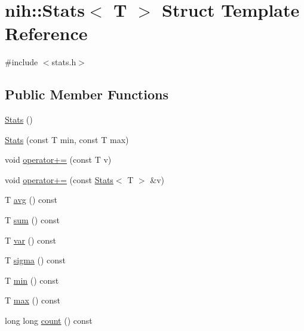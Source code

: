\hypertarget{structnih_1_1_stats}{
\section{nih\-:\-:\-Stats$<$ \-T $>$ \-Struct \-Template \-Reference}
\label{structnih_1_1_stats}
}


{\ttfamily \#include $<$stats.\-h$>$}

\subsection*{\-Public \-Member \-Functions}
\begin{DoxyCompactItemize}
\item 
\hyperlink{structnih_1_1_stats_a6e6d6f04266848eda17225b1f0402953}{\-Stats} ()
\item 
\hyperlink{structnih_1_1_stats_a882a0ca9d48e403ff6026936b669b1bb}{\-Stats} (const \-T min, const \-T max)
\item 
void \hyperlink{structnih_1_1_stats_a3cab0803fe20106b282de8d2e3dfcb3d}{operator+=} (const \-T v)
\item 
void \hyperlink{structnih_1_1_stats_aaddb68f2119f81f83c94ea2afe3e2aa0}{operator+=} (const \hyperlink{structnih_1_1_stats}{\-Stats}$<$ \-T $>$ \&v)
\item 
\-T \hyperlink{structnih_1_1_stats_af01f7f8dd7a128d55d408481e72d6615}{avg} () const 
\item 
\-T \hyperlink{structnih_1_1_stats_af08c497de2da6e0fb9f1e0e58cc7d7d5}{sum} () const 
\item 
\-T \hyperlink{structnih_1_1_stats_aa5f3bd77225bd4f92d7dfbf5b76eb2d0}{var} () const 
\item 
\-T \hyperlink{structnih_1_1_stats_af9a03822086e7f6f77cdb8d49bc191ad}{sigma} () const 
\item 
\-T \hyperlink{structnih_1_1_stats_a9004ea55168fe069477102bbc326fd30}{min} () const 
\item 
\-T \hyperlink{structnih_1_1_stats_a731ffdbad86052f9189e5dd7f89dcaba}{max} () const 
\item 
long long \hyperlink{structnih_1_1_stats_a5e68da5d70cd31130bca00c4224fe740}{count} () const 
\end{DoxyCompactItemize}
